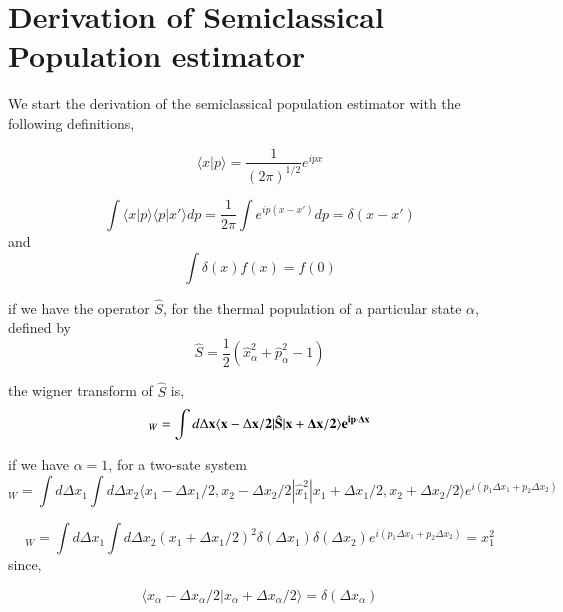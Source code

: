 \documentclass[phd,tocprelim]{cornell}
\begin{document}
\section{Derivation of Semiclassical Population estimator}
We start the derivation of the semiclassical population estimator with the following definitions,

\begin{equation}
\langle x|p\rangle = \frac{1}{(2\pi)^{1/2}}  e^{ipx} 
\end{equation}

\begin{equation}
\int \langle x|p\rangle \langle p|x'\rangle dp= \frac{1}{2\pi} \int e^{ip(x-x')} dp= \delta(x-x')
\end{equation}
and 
\begin{equation}
\int \delta (x)f(x)= f(0)
\end{equation}

if we have the operator $\hat{S}$, for the thermal population of a particular state $\alpha$, defined by
\begin{equation}
\hat{S}= \frac{1}{2}(\hat{x}_{\alpha}^2+\hat{p}_{\alpha}^2-1) 
\end{equation}

the wigner transform of $\hat{S}$ is,
\begin{equation}
[\hat{S}]_W=\int d {\Delta \bf{x}} \langle {\bf{x}}-\Delta \bf{x}/{2}| \hat{S} | {\bf{x}}+\Delta \bf{x}/{2} \rangle e^{i{\bf{p} \cdot \Delta x}}
\end{equation}

if we have $\alpha=1$, for a two-sate system
\begin{equation}
[\hat{x}_1^2]_W=\int d \Delta x_1 \int d \Delta x_2 \langle {x}_1-\Delta {x}_{1}/{2},{x}_2-\Delta {x}_{2}/{2} | \hat{x}_{1}^2 | {x}_1+\Delta {x}_{1}/{2},{x}_2+\Delta {x}_{2}/{2} \rangle e^{i(p_1\Delta x_1+p_2\Delta x_2)}
\end{equation}



\begin{equation}
[\hat{x}_1^2]_W=\int d \Delta x_1 \int d \Delta x_2 (x_1 +\Delta x_1/2)^2 \delta (\Delta x_1) \delta (\Delta x_2) e^{i(p_1\Delta x_1+p_2\Delta x_2)}= x_1^2
\end{equation}
since,

\begin{equation}
 \langle {x}_{\alpha}-\Delta {x}_{\alpha}/{2}|{x}_{\alpha}+\Delta {x}_{\alpha}/{2}\rangle= \delta (\Delta x_{\alpha})
\end{equation}
\end{document}
